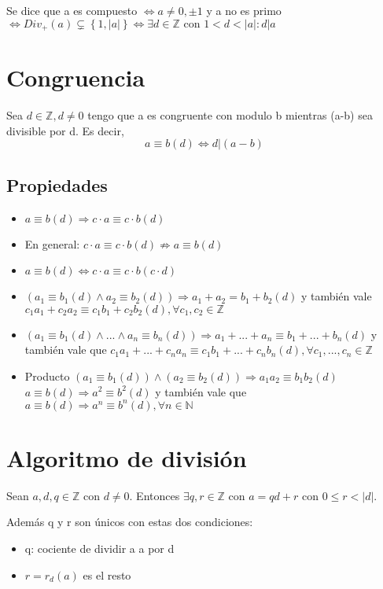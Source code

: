 \documentclass{report}
\begin{document}
Se dice que a es compuesto $\iff a \neq 0, \pm 1$ y a no es primo $\iff Div_+(a) \subsetneq \left\{1, |a|\right\} \iff \exists d \in \mathbb{Z} \text{ con } 1 < d < |a|: d|a$

\section{Congruencia}
Sea $d \in \mathbb{Z}, d \neq 0$ tengo que a es congruente con modulo b mientras (a-b) sea divisible por d. Es decir, \begin{equation}
    a \equiv b (d) \iff d|(a-b)
\end{equation}

\subsection{Propiedades}
\begin{itemize}
    \item $a \equiv b (d) \Rightarrow c \cdot a \equiv c \cdot b (d)$
    \item En general: $c \cdot a \equiv c \cdot b (d) \nRightarrow a \equiv b (d)$
    \item $a \equiv b (d) \iff c \cdot a \equiv c \cdot b (c \cdot d)$
    \item $(a_1 \equiv b_1 (d) \land a_2 \equiv b_2 (d)) \Rightarrow a_1 + a_2 = b_1 + b_2 (d)$ y también vale $c_1a_1 + c_2a_2 \equiv c_1b_1 + c_2b_2 (d), \forall c_1,c_2 \in \mathbb{Z}$
    \item $(a_1 \equiv b_1 (d) \land ... \land a_n \equiv b_n (d)) \Rightarrow a_1 + ... + a_n \equiv b_1 + ... + b_n (d)$ y también vale que $c_1a_1 + ... + c_na_n \equiv c_1b_1 + ... + c_nb_n (d), \forall c_1,...,c_n \in \mathbb{Z}$
    \item Producto
    \subitem $(a_1 \equiv b_1 (d)) \land (a_2 \equiv b_2 (d)) \Rightarrow a_1a_2 \equiv b_1b_2 (d)$
    \subitem $a \equiv b (d) \Rightarrow a^2 \equiv b^2 (d)$ y también vale que $a \equiv b (d) \Rightarrow a^n \equiv b^n (d), \forall n \in \mathbb{N}$
\end{itemize}

\section{Algoritmo de división}
Sean $a, d, q \in \mathbb{Z}$ con $d \neq 0$. Entonces $\exists q,r \in \mathbb{Z}$ con $a = qd + r$ con $0 \leq r < |d|$.

Además q y r son únicos con estas dos condiciones: \begin{itemize}
    \item q: cociente de dividir a a por d
    \item $r = r_d (a)$ es el resto
\end{itemize}
\end{document}
